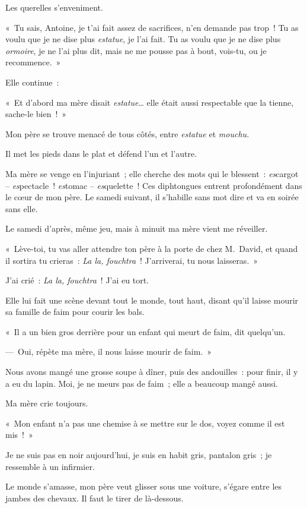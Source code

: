 \documentclass[french,twoside]{book} %
\begin{document}
Les querelles s’enveniment.\par
« Tu sais, Antoine, je t’ai fait assez de sacrifices, n’en demande pas trop ! Tu as voulu que je ne dise plus \emph{estatue}, je l’ai fait. Tu as voulu que je ne dise plus \emph{ormoire}, je ne l’ai plus dit, mais ne me pousse pas à bout, vois-tu, ou je recommence. »\par
Elle continue :\par
« Et d’abord ma mère disait \emph{estatue}… elle était aussi respectable que la tienne, sache-le bien ! »\par
Mon père se trouve menacé de tous côtés, entre \emph{estatue} et \emph{mouchu.}\par
Il met les pieds dans le plat et défend l’un et l’autre.\par
Ma mère se venge en l’injuriant ; elle cherche des mots qui le blessent : \emph{es}cargot – \emph{es}pectacle ! \emph{es}tomac – \emph{es}quelette ! Ces diphtongues entrent profondément dans le cœur de mon père. Le samedi suivant, il s’habille sans mot dire et va en soirée sans elle.\par
\bigbreak
\noindent Le samedi d’après, même jeu, mais à minuit ma mère vient me réveiller.\par
« Lève-toi, tu vas aller attendre ton père à la porte de chez M. David, et quand il sortira tu crieras : \emph{La la, fouchtra} ! J’arriverai, tu nous laisseras. »\par
\bigbreak
\noindent J’ai crié :\emph{ La la, fouchtra} ! J’ai eu tort.\par
Elle lui fait une scène devant tout le monde, tout haut, disant qu’il laisse mourir sa famille de faim pour courir les bals.\par
« Il a un bien gros derrière pour un enfant qui meurt de faim, dit quelqu’un.\par
— Oui, répète ma mère, il nous laisse mourir de faim. »\par
Nous avons mangé une grosse soupe à dîner, puis des andouilles : pour finir, il y a eu du lapin. Moi, je ne meurs pas de faim ; elle a beaucoup mangé aussi.\par
Ma mère crie toujours.\par
« Mon enfant n’a pas une chemise à se mettre sur le dos, voyez comme il est mis ! »\par
Je ne suis pas en noir aujourd’hui, je suis en habit gris, pantalon gris ; je ressemble à un infirmier.\par
Le monde s’amasse, mon père veut glisser sous une voiture, s’égare entre les jambes des chevaux. Il faut le tirer de là-dessous.\par
\end{document}
